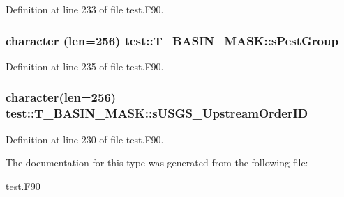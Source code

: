 Definition at line 233 of file test.F90.

\hypertarget{typetest_1_1_t___b_a_s_i_n___m_a_s_k_a7d374526df390b7d1e8debc8122e54ca}{
\subsubsection[{sPestGroup}]{\setlength{\rightskip}{0pt plus 5cm}character (len=256) {\bf test::T\_\-BASIN\_\-MASK::sPestGroup}}}
\label{typetest_1_1_t___b_a_s_i_n___m_a_s_k_a7d374526df390b7d1e8debc8122e54ca}


Definition at line 235 of file test.F90.

\hypertarget{typetest_1_1_t___b_a_s_i_n___m_a_s_k_accb8e95cae462040d538efea1871a7c6}{
\subsubsection[{sUSGS\_\-UpstreamOrderID}]{\setlength{\rightskip}{0pt plus 5cm}character(len=256) {\bf test::T\_\-BASIN\_\-MASK::sUSGS\_\-UpstreamOrderID}}}
\label{typetest_1_1_t___b_a_s_i_n___m_a_s_k_accb8e95cae462040d538efea1871a7c6}


Definition at line 230 of file test.F90.



The documentation for this type was generated from the following file:\begin{DoxyCompactItemize}
\item 
\hyperlink{test_8_f90}{test.F90}\end{DoxyCompactItemize}
